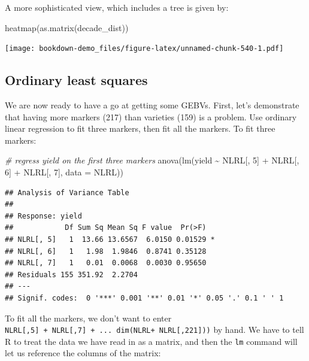 \documentclass[
]{book}
\newenvironment{Shaded}{\begin{snugshade}}{\end{snugshade}}
\newcommand{\AttributeTok}[1]{\textcolor[rgb]{0.77,0.63,0.00}{#1}}
\newcommand{\CommentTok}[1]{\textcolor[rgb]{0.56,0.35,0.01}{\textit{#1}}}
\newcommand{\DecValTok}[1]{\textcolor[rgb]{0.00,0.00,0.81}{#1}}
\newcommand{\FunctionTok}[1]{\textcolor[rgb]{0.00,0.00,0.00}{#1}}
\newcommand{\NormalTok}[1]{#1}
\newcommand{\SpecialCharTok}[1]{\textcolor[rgb]{0.00,0.00,0.00}{#1}}
\begin{document}
A more sophisticated view, which includes a tree is given by:

\begin{Shaded}
\begin{Highlighting}[]
\FunctionTok{heatmap}\NormalTok{(}\FunctionTok{as.matrix}\NormalTok{(decade\_dist))}
\end{Highlighting}
\end{Shaded}

\texttt{[image: bookdown-demo\_files/figure-latex/unnamed-chunk-540-1.pdf]}

\hypertarget{ordinary-least-squares}{%
\subsection{Ordinary least squares}\label{ordinary-least-squares}}

We are now ready to have a go at getting some GEBVs. First, let's demonstrate that having
more markers (217) than varieties (159) is a problem. Use ordinary linear regression to fit
three markers, then fit all the markers. To fit three markers:

\begin{Shaded}
\begin{Highlighting}[]
\CommentTok{\# regress yield on the first three markers}
\FunctionTok{anova}\NormalTok{(}\FunctionTok{lm}\NormalTok{(yield }\SpecialCharTok{\textasciitilde{}}\NormalTok{ NLRL[, }\DecValTok{5}\NormalTok{] }\SpecialCharTok{+}\NormalTok{ NLRL[, }\DecValTok{6}\NormalTok{] }\SpecialCharTok{+}\NormalTok{ NLRL[, }\DecValTok{7}\NormalTok{], }\AttributeTok{data =}\NormalTok{ NLRL))}
\end{Highlighting}
\end{Shaded}

\begin{verbatim}
## Analysis of Variance Table
## 
## Response: yield
##            Df Sum Sq Mean Sq F value  Pr(>F)  
## NLRL[, 5]   1  13.66 13.6567  6.0150 0.01529 *
## NLRL[, 6]   1   1.98  1.9846  0.8741 0.35128  
## NLRL[, 7]   1   0.01  0.0068  0.0030 0.95650  
## Residuals 155 351.92  2.2704                  
## ---
## Signif. codes:  0 '***' 0.001 '**' 0.01 '*' 0.05 '.' 0.1 ' ' 1
\end{verbatim}

To fit all the markers, we don't want to enter \texttt{NLRL{[},5{]}\ +\ NLRL{[},7{]}\ +\ ...\ dim(NLRL+\ NLRL{[},221{]}))} by hand. We have to tell R to treat the data we have read in as a matrix, and then the \texttt{lm} command will let us reference the columns of the matrix:
\end{document}

